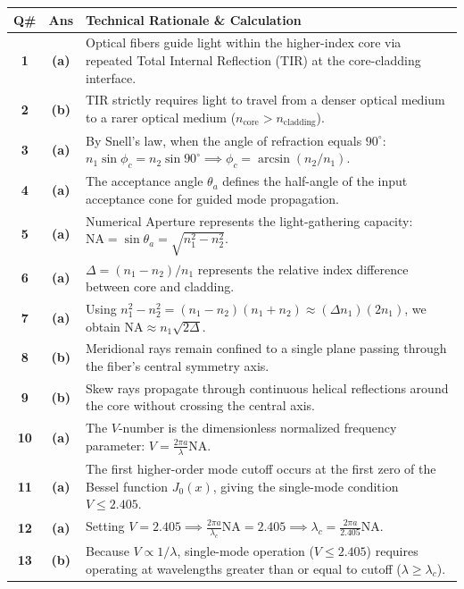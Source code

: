 {\small
\noindent\begin{tabularx}{\textwidth}{|c|c|X|}
\hline
\textbf{Q\#} & \textbf{Ans} & \textbf{Technical Rationale \& Calculation} \\
\hline
\textbf{1} & \textbf{(a)} & Optical fibers guide light within the higher-index core via repeated Total Internal Reflection (TIR) at the core-cladding interface. \\ \hline
\textbf{2} & \textbf{(b)} & TIR strictly requires light to travel from a denser optical medium to a rarer optical medium ($n_{\text{core}} > n_{\text{cladding}}$). \\ \hline
\textbf{3} & \textbf{(a)} & By Snell's law, when the angle of refraction equals $90^\circ$: $n_1 \sin\phi_c = n_2 \sin 90^\circ \implies \phi_c = \arcsin(n_2/n_1)$. \\ \hline
\textbf{4} & \textbf{(a)} & The acceptance angle $\theta_a$ defines the half-angle of the input acceptance cone for guided mode propagation. \\ \hline
\textbf{5} & \textbf{(a)} & Numerical Aperture represents the light-gathering capacity: $\text{NA} = \sin\theta_a = \sqrt{n_1^2 - n_2^2}$. \\ \hline
\textbf{6} & \textbf{(a)} & $\Delta = (n_1 - n_2)/n_1$ represents the relative index difference between core and cladding. \\ \hline
\textbf{7} & \textbf{(a)} & Using $n_1^2 - n_2^2 = (n_1 - n_2)(n_1 + n_2) \approx (\Delta n_1)(2n_1)$, we obtain $\text{NA} \approx n_1\sqrt{2\Delta}$. \\ \hline
\textbf{8} & \textbf{(b)} & Meridional rays remain confined to a single plane passing through the fiber's central symmetry axis. \\ \hline
\textbf{9} & \textbf{(b)} & Skew rays propagate through continuous helical reflections around the core without crossing the central axis. \\ \hline
\textbf{10} & \textbf{(a)} & The $V$-number is the dimensionless normalized frequency parameter: $V = \frac{2\pi a}{\lambda}\text{NA}$. \\ \hline
\textbf{11} & \textbf{(a)} & The first higher-order mode cutoff occurs at the first zero of the Bessel function $J_0(x)$, giving the single-mode condition $V \le 2.405$. \\ \hline
\textbf{12} & \textbf{(a)} & Setting $V = 2.405 \implies \frac{2\pi a}{\lambda_c}\text{NA} = 2.405 \implies \lambda_c = \frac{2\pi a}{2.405}\text{NA}$. \\ \hline
\textbf{13} & \textbf{(b)} & Because $V \propto 1/\lambda$, single-mode operation ($V \le 2.405$) requires operating at wavelengths greater than or equal to cutoff ($\lambda \ge \lambda_c$). \\ \hline

\end{tabularx}}
